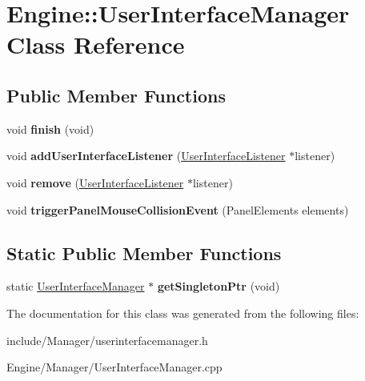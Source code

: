 \hypertarget{classEngine_1_1UserInterfaceManager}{}\section{Engine\+:\+:User\+Interface\+Manager Class Reference}
\label{classEngine_1_1UserInterfaceManager}
\subsection*{Public Member Functions}
\begin{DoxyCompactItemize}
\item 
\hypertarget{classEngine_1_1UserInterfaceManager_ab2b8b1ac9005b15c49891836c28cbeb0}{}void {\bfseries finish} (void)\label{classEngine_1_1UserInterfaceManager_ab2b8b1ac9005b15c49891836c28cbeb0}

\item 
\hypertarget{classEngine_1_1UserInterfaceManager_adb4e49137574af0d7c63264adb8ae52e}{}void {\bfseries add\+User\+Interface\+Listener} (\hyperlink{classEngine_1_1UserInterfaceListener}{User\+Interface\+Listener} $\ast$listener)\label{classEngine_1_1UserInterfaceManager_adb4e49137574af0d7c63264adb8ae52e}

\item 
\hypertarget{classEngine_1_1UserInterfaceManager_a503cd632cbd3aaf9f84742c80db4c989}{}void {\bfseries remove} (\hyperlink{classEngine_1_1UserInterfaceListener}{User\+Interface\+Listener} $\ast$listener)\label{classEngine_1_1UserInterfaceManager_a503cd632cbd3aaf9f84742c80db4c989}

\item 
\hypertarget{classEngine_1_1UserInterfaceManager_a1766365430ebc6a2ec2cbf4717f44e0d}{}void {\bfseries trigger\+Panel\+Mouse\+Collision\+Event} (Panel\+Elements elements)\label{classEngine_1_1UserInterfaceManager_a1766365430ebc6a2ec2cbf4717f44e0d}

\end{DoxyCompactItemize}
\subsection*{Static Public Member Functions}
\begin{DoxyCompactItemize}
\item 
\hypertarget{classEngine_1_1UserInterfaceManager_ac4e160fbc658fc9bdd7ef9b9e232b202}{}static \hyperlink{classEngine_1_1UserInterfaceManager}{User\+Interface\+Manager} $\ast$ {\bfseries get\+Singleton\+Ptr} (void)\label{classEngine_1_1UserInterfaceManager_ac4e160fbc658fc9bdd7ef9b9e232b202}

\end{DoxyCompactItemize}


The documentation for this class was generated from the following files\+:\begin{DoxyCompactItemize}
\item 
include/\+Manager/userinterfacemanager.\+h\item 
Engine/\+Manager/User\+Interface\+Manager.\+cpp\end{DoxyCompactItemize}
